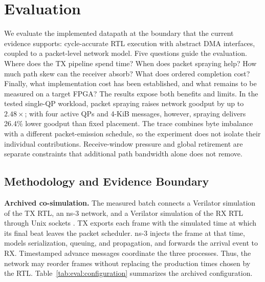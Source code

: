 \providecommand{\EvalFigureRoot}{report/figures}
\providecommand{\EvalPlanned}[1]{}

\section{Evaluation}
\label{sec:eval:overview}

We evaluate the implemented datapath at the boundary that the current evidence
supports: cycle-accurate RTL execution with abstract DMA interfaces, coupled to
a packet-level network model.  Five questions guide the evaluation.  Where does
the TX pipeline spend time?  When does packet spraying help?  How much path skew
can the receiver absorb?  What does ordered completion cost?  Finally, what
implementation cost has been established, and what remains to be measured on a
target FPGA?  The results expose both benefits and limits.  In the tested
single-QP workload, packet spraying raises network goodput by up to $2.48\times$;
with four active QPs and 4-KiB messages, however, spraying delivers 26.4\%
lower goodput than fixed placement.  The trace combines byte imbalance with a
different packet-emission schedule, so the experiment does not isolate their
individual contributions.  Receive-window pressure and global retirement are
separate constraints that additional path bandwidth alone does not remove.

\subsection{Methodology and Evidence Boundary}
\label{sec:eval:method}

\textbf{Archived co-simulation.}
The measured batch connects a Verilator simulation of the TX RTL, an ns-3
network, and a Verilator simulation of the RX RTL through Unix sockets
\cite{verilator,ns3}.  TX exports each frame with the simulated time at which
its final beat leaves the packet scheduler.  ns-3 injects the frame at that
time, models serialization, queuing, and propagation, and forwards the arrival
event to RX.  Timestamped advance messages coordinate the three processes.
Thus, the network may reorder frames without replacing the production times
chosen by the RTL.  Table~\ref{tab:eval:configuration} summarizes the archived
configuration.

